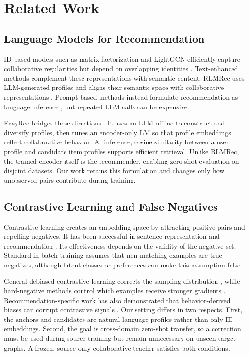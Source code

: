 \documentclass[11pt]{article}
\begin{document}
\section{Related Work}

\subsection{Language Models for Recommendation}

ID-based models such as matrix factorization and LightGCN efficiently capture collaborative regularities but depend on overlapping identities \citep{rendle2009bpr,he2020lightgcn}.
Text-enhanced methods complement these representations with semantic content.
RLMRec uses LLM-generated profiles and aligns their semantic space with collaborative representations \citep{ren2024rlmrec}.
Prompt-based methods instead formulate recommendation as language inference \citep{lyu-etal-2024-llm}, but repeated LLM calls can be expensive.

EasyRec bridges these directions \citep{ren-huang-2025-easyrec}.
It uses an LLM offline to construct and diversify profiles, then tunes an encoder-only LM so that profile embeddings reflect collaborative behavior.
At inference, cosine similarity between a user profile and candidate item profiles supports efficient retrieval.
Unlike RLMRec, the trained encoder itself is the recommender, enabling zero-shot evaluation on disjoint datasets.
Our work retains this formulation and changes only how unobserved pairs contribute during training.

\subsection{Contrastive Learning and False Negatives}

Contrastive learning creates an embedding space by attracting positive pairs and repelling negatives.
It has been successful in sentence representation \citep{gao-etal-2021-simcse} and recommendation \citep{wu2021sgl,lin2022ncl}.
Its effectiveness depends on the validity of the negative set.
Standard in-batch training assumes that non-matching examples are true negatives, although latent classes or preferences can make this assumption false.

General debiased contrastive learning corrects the sampling distribution \citep{chuang2020debiased}, while hard-negative methods control which examples receive stronger gradients \citep{robinson2021hard}.
Recommendation-specific work has also demonstrated that behavior-derived biases can corrupt contrastive signals \citep{yang2023dcrec}.
Our setting differs in two respects.
First, the anchors and candidates are natural-language profiles rather than only ID embeddings.
Second, the goal is cross-domain zero-shot transfer, so a correction must be used during source training but remain unnecessary on unseen target graphs.
A frozen, source-only collaborative teacher satisfies both conditions.
\end{document}
